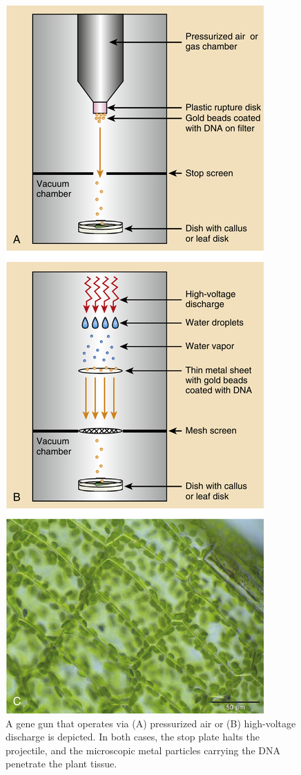 \documentclass[nofonts,]{tufte-handout}
\begin{document}
\begin{figure}
\includegraphics[width=0.9\linewidth]{./images/gene_gun_transfer} \caption[A gene gun that operates via (A) pressurized air or (B) high-voltage discharge is depicted]{A gene gun that operates via (A) pressurized air or (B) high-voltage discharge is depicted. In both cases, the stop plate halts the projectile, and the microscopic metal particles carrying the DNA penetrate the plant tissue.}\label{fig:gene-gun-transfer}
\end{figure}
\end{document}
